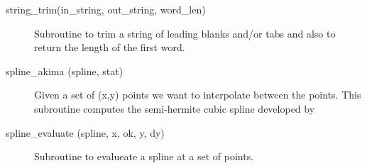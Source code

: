 \begin{description}
\item[string\_trim(in\_string, out\_string, word\_len)] \Newline 
     Subroutine to trim a string of leading blanks and/or tabs and also to return the
     length of the first word.

\item[spline\_akima (spline, stat)] \Newline 
     Given a set of (x,y) points we want to interpolate between the points.
     This subroutine computes the semi-hermite cubic spline developed by 

\item[spline\_evaluate (spline, x, ok, y, dy)] \Newline 
     Subroutine to evalueate a spline at a set of points.

\end{description}
